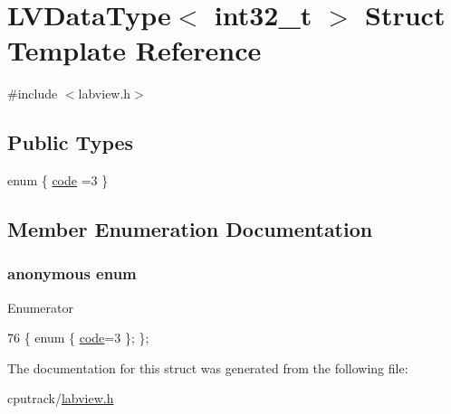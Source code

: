 \hypertarget{struct_l_v_data_type_3_01int32__t_01_4}{}\section{L\+V\+Data\+Type$<$ int32\+\_\+t $>$ Struct Template Reference}
\label{struct_l_v_data_type_3_01int32__t_01_4}


{\ttfamily \#include $<$labview.\+h$>$}

\subsection*{Public Types}
\begin{DoxyCompactItemize}
\item 
enum \{ \hyperlink{struct_l_v_data_type_3_01int32__t_01_4_a66d38f222a7b0c225ec4d5a52d8c726eaf02dc44176417c2fb501b3c15d277075}{code} =3
 \}
\end{DoxyCompactItemize}


\subsection{Member Enumeration Documentation}
\subsubsection[{\texorpdfstring{anonymous enum}{anonymous enum}}]{\setlength{\rightskip}{0pt plus 5cm}anonymous enum}\hypertarget{struct_l_v_data_type_3_01int32__t_01_4_a66d38f222a7b0c225ec4d5a52d8c726e}{}\label{struct_l_v_data_type_3_01int32__t_01_4_a66d38f222a7b0c225ec4d5a52d8c726e}
\begin{Desc}
\item[Enumerator]\par
\begin{description}
\item[{\em 
code\hypertarget{struct_l_v_data_type_3_01int32__t_01_4_a66d38f222a7b0c225ec4d5a52d8c726eaf02dc44176417c2fb501b3c15d277075}{}\label{struct_l_v_data_type_3_01int32__t_01_4_a66d38f222a7b0c225ec4d5a52d8c726eaf02dc44176417c2fb501b3c15d277075}
}]\end{description}
\end{Desc}

\begin{DoxyCode}
76 \{ \textcolor{keyword}{enum} \{ \hyperlink{struct_l_v_data_type_3_01int32__t_01_4_a66d38f222a7b0c225ec4d5a52d8c726eaf02dc44176417c2fb501b3c15d277075}{code}=3 \}; \};
\end{DoxyCode}


The documentation for this struct was generated from the following file\+:\begin{DoxyCompactItemize}
\item 
cputrack/\hyperlink{labview_8h}{labview.\+h}\end{DoxyCompactItemize}
